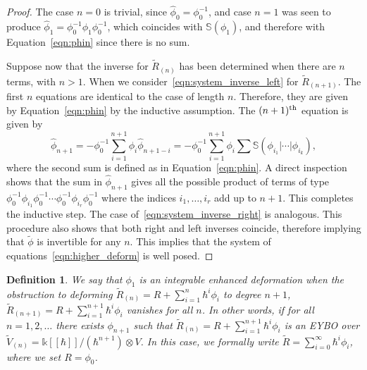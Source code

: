 \documentclass[11pt,fleqn]{amsart} %
\newtheorem{definition}[theorem]{Definition}
\begin{document}
\begin{proof}
		The case $n=0$ is trivial, since $\hat \phi_0 = \phi_0^{-1}$, and case $n=1$ was seen to produce $\hat \phi_1 = \phi_0^{-1}\phi_1\phi_0^{-1}$, which coincides with $\mathbb S(\phi_1)$, and therefore with Equation~\eqref{eqn:phin} since there is no sum. 
		
		Suppose now that the inverse for $\tilde R_{(n)}$ has been determined when there are $n$ terms, with $n>1$. When we consider~\eqref{eqn:system_inverse_left} for $\tilde R_{(n+1)} $. 
		 The first $n$ equations are identical to the case of length $n$. Therefore, they are given by Equation~\eqref{eqn:phin} by the inductive assumption. The $(n+1)^{\rm th}$ equation is given by 
		$$\hat \phi_{n+1} = - \phi_0^{-1} \sum_{i=1}^{n+1} \phi_i \hat \phi_{n+1-i} = - \phi_0^{-1} \sum_{i=1}^{n+1} \phi_i\sum \mathbb S(\phi_{i_1}|\cdots |\phi_{i_k}), $$
		where the second sum is defined as in Equation~\eqref{eqn:phin}. A direct inspection shows that the sum in $\hat \phi_{n+1}$ gives all the possible product of terms of type $\phi_0^{-1}\phi_{i_1} \phi_0^{-1} \cdots \phi_0^{-1}\phi_{i_r}\phi_0^{-1}$ where the indices $i_1, \ldots, i_r$ add up to $n+1$. This completes the inductive step. The case of~\eqref{eqn:system_inverse_right} is analogous. This procedure also shows that both right and left inverses coincide, therefore implying that $\tilde \phi$ is invertible for any $n$. This implies that the system of equations~\eqref{eqn:higher_deform} is well posed.
		\end{proof}


\begin{definition}
	{\rm
			We say that $\phi_1$ is an {\rm integrable enhanced deformation} when the obstruction to deforming $\tilde R_{(n)} = R + \sum_{i=1}^n\hbar^i\phi_i$ to degree $n+1$, $\tilde R_{(n+1)} = R + \sum_{i=1}^{n+1}\hbar^i\phi_i$  vanishes for all $n$. In other words, if for all $n=1, 2, \ldots $ 
			 there exists 
			$\phi_{n+1}$ such that $\tilde R_{(n)} = R + \sum_{i=1}^{n+1}\hbar^i\phi_i$ is an EYBO over 
			$\tilde V_{(n)} = \mathbb k[[\hbar]]/(\hbar^{n+1})\otimes V$. In this case, we formally write $\tilde R = \sum_{i=0}^\infty \hbar^i\phi_i$, where we set $R = \phi_0$.  
	}
\end{definition}
\end{document}
